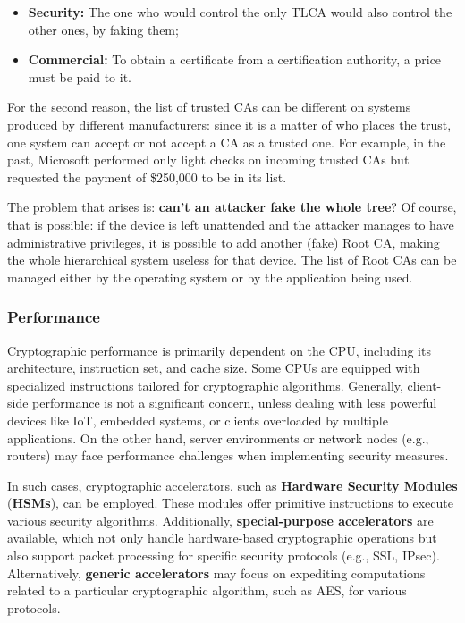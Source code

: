 \begin{itemize}
    \item \textbf{Security:} The one who would control the only TLCA would also control the other ones, by faking them;
    \item \textbf{Commercial:} To obtain a certificate from a certification authority, a price must be paid to it.
\end{itemize}

For the second reason, the list of trusted CAs can be different on systems produced by different manufacturers: since it is a matter of who places the trust, one system can accept or not accept a CA as a trusted one. For example, in the past, Microsoft performed only light checks on incoming trusted CAs but requested the payment of \$250,000 to be in its list.

The problem that arises is: \textbf{can't an attacker fake the whole tree}? 
Of course, that is possible: if the device is left unattended and the attacker manages to have administrative privileges, it is possible to add another (fake) Root CA, making the whole hierarchical system useless for that device. 
The list of Root CAs can be managed either by the operating system or by the application being used.


\subsubsection{Performance}
Cryptographic performance is primarily dependent on the CPU, including its architecture, instruction set, and cache size. Some CPUs are equipped with specialized instructions tailored for cryptographic algorithms. Generally, client-side performance is not a significant concern, unless dealing with less powerful devices like IoT, embedded systems, or clients overloaded by multiple applications. On the other hand, server environments or network nodes (e.g., routers) may face performance challenges when implementing security measures. 

In such cases, cryptographic accelerators, such as \textbf{Hardware Security Modules} (\textbf{HSMs}), can be employed. These modules offer primitive instructions to execute various security algorithms. Additionally, \textbf{special-purpose accelerators} are available, which not only handle hardware-based cryptographic operations but also support packet processing for specific security protocols (e.g., SSL, IPsec). Alternatively, \textbf{generic accelerators} may focus on expediting computations related to a particular cryptographic algorithm, such as AES, for various protocols.


